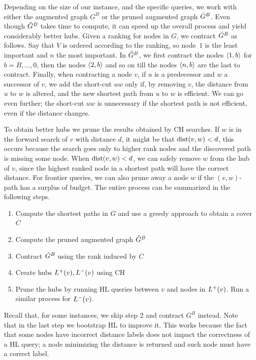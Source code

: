 \documentclass[opre,nonblindrev]{informs3} %
\begin{document}
Depending on the size of our instance, and the specific queries, we work with either the augmented graph $G^B$ or the pruned augmented graph $\tilde G^B$.
Even though $\tilde G^B$ takes time to compute, it can speed up the overall process and yield considerably better hubs. 
Given a ranking for nodes in $G$, we contract $\tilde G^B$ as follows.
Say that $V$ is ordered according to the ranking, so node~$1$ is the least important and $n$ the most important.
In $\tilde G^B$, we first contract the nodes $\langle1,b\rangle$ for $b=B,\ldots,0$, then the nodes $\langle2,b\rangle$ and so on till the nodes $\langle n,b\rangle$ are the last to contract. 
Finally, when contracting a node $v$, if $u$ is a predecessor and $w$ a successor of $v$, we add the short-cut $uw$ only if, by removing $v$, the distance from $u$ to $w$ is altered, and the new shortest path from $u$ to $w$ is efficient.
We can go even further; the short-cut $uw$ is unnecessary if the shortest path is not efficient, even if the distance changes.

To obtain better hubs we prune the results obtained by CH searches.
If $w$ is in the forward search of $v$ with distance $d$, it might be that $\mbox{dist}(v,w)<d$, this occurs because the search goes only to higher rank nodes and the discovered path is missing some node.
When $\mbox{dist}(v,w)<d$, we can safely remove $w$ from the hub of $v$, since the highest ranked node in a shortest path will have the correct distance.
For frontier queries, we can also prune away a node $w$ if the $(v,w)$-path has a surplus of budget.
The entire process can be summarized in the following steps.




\begin{enumerate}[nosep]
\item Compute the shortest paths in $G$ and use a greedy approach to obtain a cover $C$
\item Compute the pruned augmented graph $\tilde G^B$
\item Contract $\tilde G^B$ using the rank induced by $C$
\item Create hubs $L^+(v),L^-(v)$ using CH
\item Prune the hubs by running HL queries between $v$ and nodes in $L^+(v)$. 
Run a similar process for $L^-(v)$.
\end{enumerate}
Recall that, for some instances, we skip step 2 and contract $G^B$ instead.
Note that in the last step we bootstrap HL to improve it.
This works because the fact that some nodes have incorrect distance labels does not impact the correctness of a HL query; a node minimizing the distance is returned and such node must have a correct label.
\end{document}
